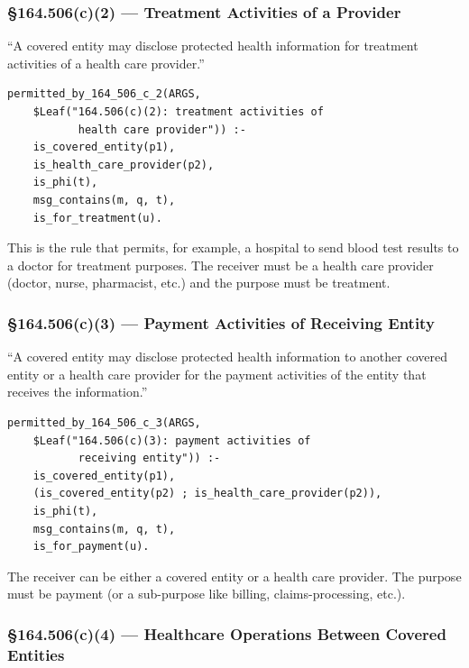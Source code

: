 \documentclass[11pt,letterpaper]{article}
\begin{document}
\subsubsection{\S 164.506(c)(2) --- Treatment Activities of a Provider}

\begin{hipaabox}
``A covered entity may disclose protected health information for treatment activities of a health care provider.''
\end{hipaabox}

\begin{lstlisting}[style=soufflestyle,caption={\S 164.506(c)(2)}]
permitted_by_164_506_c_2(ARGS,
    $Leaf("164.506(c)(2): treatment activities of
           health care provider")) :-
    is_covered_entity(p1),
    is_health_care_provider(p2),
    is_phi(t),
    msg_contains(m, q, t),
    is_for_treatment(u).
\end{lstlisting}

This is the rule that permits, for example, a hospital to send blood test results to a doctor for treatment purposes. The receiver must be a health care provider (doctor, nurse, pharmacist, etc.) and the purpose must be treatment.

\subsubsection{\S 164.506(c)(3) --- Payment Activities of Receiving Entity}

\begin{hipaabox}
``A covered entity may disclose protected health information to another covered entity or a health care provider for the payment activities of the entity that receives the information.''
\end{hipaabox}

\begin{lstlisting}[style=soufflestyle,caption={\S 164.506(c)(3)}]
permitted_by_164_506_c_3(ARGS,
    $Leaf("164.506(c)(3): payment activities of
           receiving entity")) :-
    is_covered_entity(p1),
    (is_covered_entity(p2) ; is_health_care_provider(p2)),
    is_phi(t),
    msg_contains(m, q, t),
    is_for_payment(u).
\end{lstlisting}

The receiver can be either a covered entity or a health care provider. The purpose must be payment (or a sub-purpose like billing, claims-processing, etc.).

\subsubsection{\S 164.506(c)(4) --- Healthcare Operations Between Covered Entities}
\end{document}
